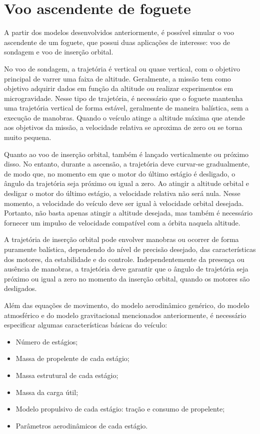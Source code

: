 \section{Voo ascendente de foguete}

A partir dos modelos desenvolvidos anteriormente, é possível simular o voo ascendente de um foguete, que possui duas aplicações de interesse: voo de sondagem e voo de inserção orbital.

No voo de sondagem, a trajetória é vertical ou quase vertical, com o objetivo principal de varrer uma faixa de altitude. Geralmente, a missão tem como objetivo adquirir dados em função da altitude ou realizar experimentos em microgravidade. Nesse tipo de trajetória, é necessário que o foguete mantenha uma trajetória vertical de forma estável, geralmente de maneira balística, sem a execução de manobras. Quando o veículo atinge a altitude máxima que atende aos objetivos da missão, a velocidade relativa se aproxima de zero ou se torna muito pequena.

Quanto ao voo de inserção orbital, também é lançado verticalmente ou próximo disso. No entanto, durante a ascensão, a trajetória deve curvar-se gradualmente, de modo que, no momento em que o motor do último estágio é desligado, o ângulo da trajetória seja próximo ou igual a zero. Ao atingir a altitude orbital e desligar o motor do último estágio, a velocidade relativa não será nula. Nesse momento, a velocidade do veículo deve ser igual à velocidade orbital desejada. Portanto, não basta apenas atingir a altitude desejada, mas também é necessário fornecer um impulso de velocidade compatível com a órbita naquela altitude.

A trajetória de inserção orbital pode envolver manobras ou ocorrer de forma puramente balística, dependendo do nível de precisão desejado, das características dos motores, da estabilidade e do controle. Independentemente da presença ou ausência de manobras, a trajetória deve garantir que o ângulo de trajetória seja próximo ou igual a zero no momento da inserção orbital, quando os motores são desligados.

Além das equações de movimento, do modelo aerodinâmico genérico, do modelo atmosférico e do modelo gravitacional mencionados anteriormente, é necessário especificar algumas características básicas do veículo:

\begin{itemize}
    \item Número de estágios;
    \item Massa de propelente de cada estágio;
    \item Massa estrutural de cada estágio;
    \item Massa da carga útil;
    \item Modelo propulsivo de cada estágio: tração e consumo de propelente;
    \item Parâmetros aerodinâmicos de cada estágio.
\end{itemize}

